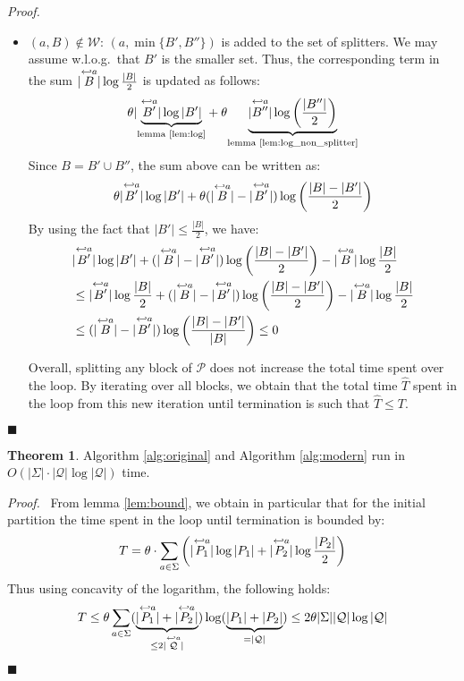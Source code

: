 \documentclass[12pt, a4 paper]{article}
\renewenvironment{proof}[1][Proof]{\begin{mdframed}[backgroundcolor=black!5, topline=false, rightline=false, bottomline=false, linecolor=black!15, linewidth=3pt]{\noindent\textit{#1.}\ }}{\noindent\par\hfill$\blacksquare$\end{mdframed}}
\theoremstyle{definition}
\newtheorem{theorem}{Theorem}
\begin{document}
\begin{proof}
\begin{itemize}
        \item $(a, B) \notin \mathcal{W}$: $(a, \min\{B', B''\})$ is added to the set of splitters. We may assume w.l.o.g.\ that $B'$ is the smaller set.
        Thus, the corresponding term in the sum $|\overset{\hookleftarrow {a}}{B}| \log \frac{| B |}{2}$ is updated as follows:
        \begin{equation*}
            \theta | \underset{\text{lemma \ref{lem:log}}}{\underbrace{\overset{\hookleftarrow {a}}{B'} | \log | B' |}} + \theta \underset{\text{lemma \ref{lem:log_non_splitter}}}{\underbrace{|\overset{\hookleftarrow {a}}{B''} | \log \left(\frac{| B'' |}{2}\right)}}
        \end{equation*}
        Since $B = B' \cup B''$, the sum above can be written as:
        \begin{equation*}
            \theta | \overset{\hookleftarrow {a}}{B'} | \log | B' | + \theta (| \overset{\hookleftarrow {a}}{B} | - | \overset{\hookleftarrow {a}}{B'} |) \log \left(\frac{|B|-|B'|}{2}\right)
        \end{equation*}
        By using the fact that $\displaystyle{| B' | \leq \frac{|B|}{2}}$, we have:
        \begin{align*}
            & | \overset{\hookleftarrow {a}}{B'} | \log | B'| + (| \overset{\hookleftarrow {a}}{B} | - | \overset{\hookleftarrow {a}}{B'}|)\log \left(\frac{| B | - |B'|}{2} \right) - |\overset{\hookleftarrow {a}}{B}| \log \frac{|B|}{2} \\
            & \leq | \overset{\hookleftarrow {a}}{B'}| \log \frac{| B |}{2} + (| \overset{\hookleftarrow {a}}{B}| - | \overset{\hookleftarrow {a}}{B'}|) \log \left(\frac{|B| - |B'|}{2}\right) - | \overset{\hookleftarrow {a}}{B}| \log \frac{| B |}{2} \\
            & \leq (| \overset{\hookleftarrow {a}}{B}| - | \overset{\hookleftarrow {a}}{B'} |) \log \left(\frac{| B | - | B' |}{| B |}\right) \leq 0
        \end{align*}

        Overall, splitting any block of $\mathcal{P}$ does not increase the total time spent over the loop.
        By iterating over all blocks, we obtain that the total time $\hat{T}$ spent in the loop from this new iteration until termination is such that $\hat{T} \leq T$.
    \end{itemize}
\end{proof}

\bigskip

\begin{theorem}
    \label{thm:complexity}
    Algorithm \ref{alg:original} and Algorithm \ref{alg:modern} run in $O\left(|\Sigma|\cdot|\mathcal{Q}| \log |\mathcal{Q}|\right)$ time.
\end{theorem}
\begin{proof}
From lemma \ref{lem:bound}, we obtain in particular that for the initial partition the time spent in the loop until termination is bounded by:
$$T = \theta \cdot \sum_{a \in \Sigma}\left(| \overset{\hookleftarrow {a}}{P_1} | \log | P_1 | + | \overset{\hookleftarrow {a}}{P_2} | \log \frac{| P_2 |}{2}\right)$$
Thus using concavity of the logarithm, the following holds:
$$T \leq \theta \sum_{a \in \Sigma} (\underset{\leq 2|\overset{\hookleftarrow {a}}{\mathcal{Q}}|}{\underbrace{|\overset{\hookleftarrow {a}}{P_1}| + |\overset{\hookleftarrow {a}}{P_2}|}})\log(\underset{= |\mathcal{Q}|}{\underbrace{|P_1| + |P_2|}}) \leq 2 \theta|\Sigma||\mathcal{Q}| \log |\mathcal{Q}|$$
\end{proof}
\end{document}

